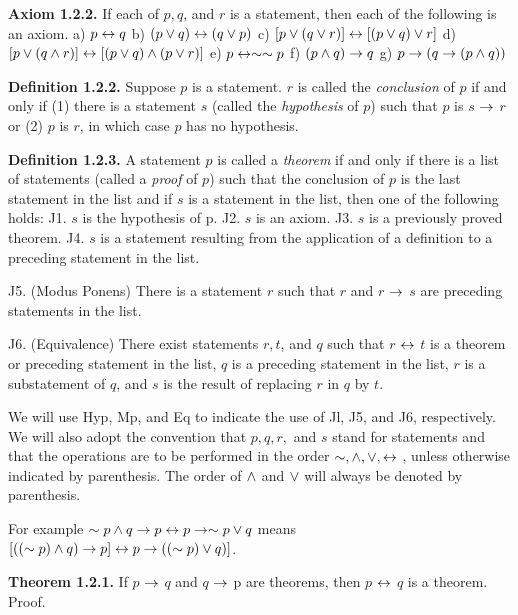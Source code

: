 \begin{large}
\fl \textbf{Axiom 1.2.2.} If each of $p, q$, and $r$ is a statement, then each of
the following is an axiom. \nl
a) $p \leftrightarrow q$\nl
b) $(p \lor q) \leftrightarrow (q \lor p)$ \nl
c) $[p \lor (q \lor r)]  \leftrightarrow [(p \lor q) \lor r] $ \nl
d) $[p \lor (q \wedge r)] \leftrightarrow [(p \lor q) \wedge (p \lor r)]$ \nl
e) $p \leftrightarrow \sim \sim p$ \nl
f) $(p \wedge q) \to q $ \nl
g) $p \to (q \to (p \wedge q))$ \nl

\fl \textbf{Definition 1.2.2.} Suppose $p$ is a statement. $r$ is called the \textit{conclusion} of $p$ if and only if (1) there is a statement $s$ (called the \textit{hypothesis} of $p$) such that $p$ is $s$ $\to$ $r$ or (2) $p$ is $r$, in which case $p$ has no hypothesis. \nl

\fl \textbf{Definition 1.2.3.} A statement $p$ is called a \textit{theorem} if and only if there is a list of statements (called a \textit{proof} of $p$) such that the conclusion of $p$ is the last statement in the list and if $s$ is a statement in the list, then one of the following holds: \nl
\fl J1. $s$ is the hypothesis of p. \nl
\fl J2. $s$ is an axiom. \nl
\fl J3. $s$ is a previously proved theorem. \nl
\fl J4. $s$ is a statement resulting from the application of a definition to a
preceding statement in the list. \nl

\fl J5. (Modus Ponens) There is a statement $r$ such that $r$ and $r$ $\to$ $s$ are preceding statements in the list. \nl

\fl J6. (Equivalence) There exist statements $r, t$, and $q$ such that $r$ $\leftrightarrow$ $t$ is a theorem or preceding statement in the list, $q$ is a preceding statement in the list, $r$ is a substatement of $q$, and $s$ is the result of re­placing $r$ in $q$ by $t$.\nl

\newpage

We will use Hyp, Mp, and Eq to indicate the use of Jl, J5, and J6, respectively. We will also adopt the convention that $p, q, r,$ and $s$ stand for statements and that the operations are to be performed in the order $\sim, \wedge , \lor , \leftrightarrow$ ,  unless otherwise indicated by parenthesis. The order of $\wedge$ and  $\lor$ will always be denoted by parenthesis. \nl

For example $ \sim p \wedge q \to p \leftrightarrow p \to \sim p \lor q$ means $[(( \sim p) \wedge q) \to p] \leftrightarrow p \to ((\sim p) \lor q)]$. \nl

\fl \textbf{Theorem 1.2.1.} If $p$ $\to$ $q$ and $q$ $\to$ p are theorems, then $p$ $\leftrightarrow$ $q$ is a theorem. \nl
\fl Proof. \nl
\begin{tabular}{ l l }


\end{tabular}
\end{large}
